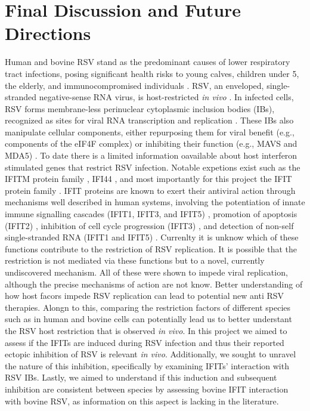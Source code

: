 \chapter{Final Discussion and Future Directions}
Human and bovine RSV stand as the predominant causes of lower respiratory tract infections, posing significant health risks to young calves, children under 5, the elderly, and immunocompromised individuals \cite{Falsey2005RespiratoryAdults, Coultas2019RespiratoryAge}. RSV, an enveloped, single-stranded negative-sense RNA virus, is host-restricted \textit{in vivo} \cite{Buchholz2000ChimericVaccine}. In infected cells, RSV forms membrane-less perinuclear cytoplasmic inclusion bodies (IBs), recognized as sites for viral RNA transcription and replication \cite{Rincheval2017FunctionalVirus, Jobe2020RespiratorySignaling, Jobe2023ViralCondensates}. These IBs also manipulate cellular components, either repurposing them for viral benefit (e.g., components of the eIF4F complex) \cite{Jobe2023ViralCondensates} or inhibiting their function (e.g., MAVS and MDA5) \cite{Lifland2012HumanMAVS}. To date there is a limited information oavailable about host interferon stimulated genes that restrict RSV infection. Notable expetions exist such as the IFITM protein family \cite{Smith2019Interferon-InducedMembrane}, IFI44 \cite{McDonald2016ADisease, Li2021IdentificationVirus}, and most importantly for this project the IFIT protein family \cite{Drori2020InfluenzaProteins}. IFIT proteins are known to exert their antiviral action through mechanisms well described in human systems, involving the potentiation of innate immune signalling cascades (IFIT1, IFIT3, and IFIT5) \cite{Li2009ISG56Response, Reynaud2015IFIT1Interferon, Liu2011IFN-InducedTBK1, Zhang2013IFIT5Pathways}, promotion of apoptosis (IFIT2) \cite{Chen2017InhibitionApoptosis, Diamond2013TheProteins}, inhibition of cell cycle progression (IFIT3) \cite{Xiao2006RIG-GProteins}, and detection of non-self single-stranded RNA (IFIT1 and IFIT5) \cite{Abbas2013StructuralProteins, Pichlmair2011IFIT1RNA, Diamond2014IFIT1:Translation, Mears2018BetterResponse}. Currenlty it is unknow which of these functions contribute to the restriction of RSV replication. It is possible that the restriction is not mediated via these functions but to a novel, currently undiscovered mechanism. All of these were shown to impede viral replication, although the precise mechanisms of action are not know. Better understanding of how host facors impede RSV replication can lead to potential new anti RSV therapies. Alongn to this, comparing the restriction factors of different species such as in human and bovine cells can potentially lead us to better understant the RSV host restriction that is observed \textit{in vivo}. In this project we aimed to assess if the IFITs are induced during RSV infection and thus their reported ectopic inhibition of RSV is relevant \textit{in vivo}. Additionally, we sought to unravel the nature of this inhibition, specifically by examining IFITs' interaction with RSV IBs. Lastly, we aimed to understand if this induction and subsequent inhibition are consistent between species by assessing bovine IFIT interaction with bovine RSV, as information on this aspect is lacking in the literature.

